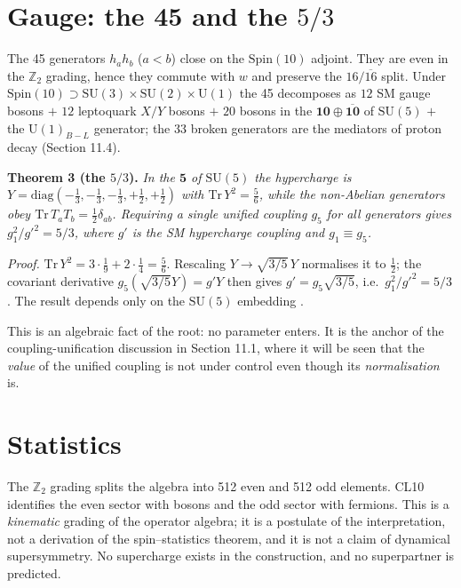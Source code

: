 \documentclass[aps,prd,twocolumn,amsmath,amssymb,superscriptaddress,nofootinbib,floatfix]{revtex4-2}
\begin{document}
\section{\texorpdfstring{Gauge: the 45 and the
\(5/3\)}{Gauge: the 45 and the 5/3}}\label{gauge-the-45-and-the-53}

The 45 generators \(h_a h_b\) (\(a<b\)) close on the
\(\mathrm{Spin}(10)\) adjoint. They are even in the \(\mathbb{Z}_2\)
grading, hence they commute with \(w\) and preserve the
\(16/\overline{16}\) split. Under
\(\mathrm{Spin}(10)\supset\mathrm{SU}(3)\times\mathrm{SU}(2)\times\mathrm{U}(1)\)
the 45 decomposes as \(12\) SM gauge bosons \(+\) \(12\) leptoquark
\(X/Y\) bosons \(+\) \(20\) bosons in the
\(\mathbf{10}\oplus\overline{\mathbf{10}}\) of \(\mathrm{SU}(5)\) \(+\)
the \(\mathrm{U}(1)_{B-L}\) generator; the 33 broken generators are the
mediators of proton decay (Section 11.4).

\textbf{Theorem 3 (the \(5/3\)).} \emph{In the \(\mathbf 5\) of
\(\mathrm{SU}(5)\) the hypercharge is
\(Y = \mathrm{diag}(-\tfrac13,-\tfrac13,-\tfrac13,+\tfrac12,+\tfrac12)\)
with \(\mathrm{Tr}\,Y^2 = \tfrac56\), while the non-Abelian generators
obey \(\mathrm{Tr}\,T_aT_b = \tfrac12\delta_{ab}\). Requiring a single
unified coupling \(g_5\) for all generators gives \(g_1^2/g'^2 = 5/3\),
where \(g'\) is the SM hypercharge coupling and \(g_1 \equiv g_5\).}

\emph{Proof.}
\(\mathrm{Tr}\,Y^2 = 3\cdot\tfrac19 + 2\cdot\tfrac14 = \tfrac56\).
Rescaling \(Y \to \sqrt{3/5}\,Y\) normalises it to \(\tfrac12\); the
covariant derivative \(g_5 (\sqrt{3/5}Y) = g' Y\) then gives
\(g' = g_5\sqrt{3/5}\), i.e.~\(g_1^2/g'^2 = 5/3\). The result depends
only on the \(\mathrm{SU}(5)\) embedding \cite{ref06,ref09}.

This is an algebraic fact of the root: no parameter enters. It is the
anchor of the coupling-unification discussion in Section 11.1, where it
will be seen that the \emph{value} of the unified coupling is not under
control even though its \emph{normalisation} is.

\section{Statistics}\label{statistics}

The \(\mathbb{Z}_2\) grading splits the algebra into 512 even and 512
odd elements. CL10 identifies the even sector with bosons and the odd
sector with fermions. This is a \emph{kinematic} grading of the operator
algebra; it is a postulate of the interpretation, not a derivation of
the spin--statistics theorem, and it is not a claim of dynamical
supersymmetry. No supercharge exists in the construction, and no
superpartner is predicted.
\end{document}
